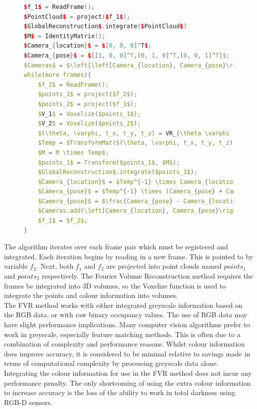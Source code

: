 \begin{figure}
\begin{lstlisting}[language=c++,caption=Phase Correlation Based SLAM Algorithm,label=algorithm:PCSLAMNo1,mathescape,basicstyle=\ttfamily]
$f_1$ = ReadFrame();
$PointCloud$ = project($f_1$);
$GlobalReconstruction$.integrate($PointCloud$)
$M$ = IdentityMatrix();
$Camera_{location}$ = $[0, 0, 0]^T$;
$Camera_{pose}$ = $[[1, 0, 0]^T,[0, 1, 0]^T,[0, 0, 1]^T]$;
$Cameras$ = $\left[\left[Camera_{location}, Camera_{pose}\right] \right]$;
while(more frames){
	$f_2$ = ReadFrame();
	$points_1$ = project($f_2$);
	$points_2$ = project($f_1$);
	$V_1$ = Voxelize($points_1$);
	$V_2$ = Voxelize($points_2$);
	$(\theta, \varphi, t_x, t_y, t_z) = VR_{\theta \varphi t_x t_y t_z}(V_1, V_2)$;
	$Temp = $TransformMat($(\theta, \varphi, t_x, t_y, t_z)$);
	$M = M \times Temp$;
	$points_1$ = Transform($points_1$, $M$);
	$GlobalReconstruction$.integrate($points_1$);
	$Camera_{location}$ = $Temp^{-1} \times Camera_{location}$;
	$Camera_{pose}$ = $Temp^{-1} \times (Camera_{pose} + Camera_{location})$;
	$Camera_{pose}$ = $\frac{Camera_{pose} - Camera_{location}}{Camera_{pose} - Camera_{location}}$;
	$Cameras.add(\left[Camera_{location}, Camera_{pose}\right])$;
	$f_1$ = $f_2$;
}
\end{lstlisting}
\end{figure}

The algorithm iterates over each frame pair which must be registered and integrated. Each iteration begins by reading in a new frame. This is pointed to by variable $f_2$. Next, both $f_1$ and $f_2$ are projected into point clouds named $points_1$ and $points_2$ respectively. The Fourier Volume Reconstruction method requires the frames be integrated into 3D volumes, so the Voxelize function is used to integrate the points and colour information into volumes. \\

The FVR method works with either integrated greyscale information based on the RGB data, or with raw binary occupancy values. The use of RGB data may have slight performance implications. Many computer vision algorithms prefer to work in greyscale, especially feature matching methods. This is often due to a combination of complexity and performance reasons. Whilst colour information does improve accuracy, it is considered to be minimal relative to savings made in terms of computational complexity by processing greyscale data alone. \\

Integrating the colour information for use in the FVR method does not incur any performance penalty. The only shortcoming of using the extra colour information to increase accuracy is the loss of the ability to work in total darkness using RGB-D sensors. \\

